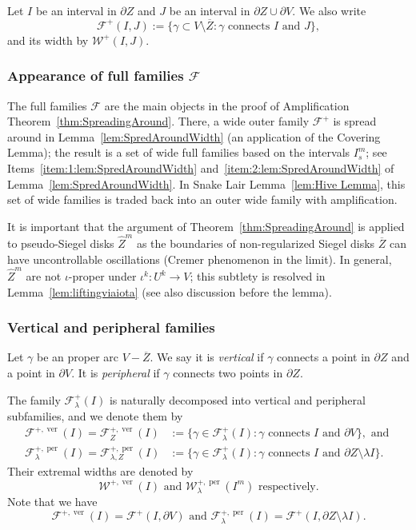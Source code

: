 \documentclass{amsart}
\newcommand{\1}{{\mathbb 1 }}
\newcommand{\Fam}{{\mathcal F}}
\newcommand{\Width}{{\mathcal W}}
\newcommand{\wZ}{{\widehat Z}}
\newcommand\ver{{\operatorname{ver}}}
\newcommand\per{{\operatorname{per}}}
\theoremstyle{remark}
\numberwithin{equation}{section}
\theoremstyle{definition}
\begin{document}
Let $I$ be an interval in $\partial Z$ and $J$ be an interval in $\partial Z \cup \partial V$. We also write
$$
\Fam^{+}(I, J):= \{\gamma \subset V \setminus \overline{Z}: \gamma \text{ connects $I$ and $J$}\},
$$
and its width by $\Width^{+}(I, J)$. 


\subsubsection{Appearance of full families $\Fam$}\label{sss:occ:Fam} The full families $\Fam$ are the main objects in the proof of Amplification Theorem~\ref{thm:SpreadingAround}. There, a wide outer family $\Fam^+$ is spread around in Lemma~\ref{lem:SpredAroundWidth} (an application of the Covering Lemma); the result is a set of wide full families based on the intervals $I^m_s$; see Items~\ref{item:1:lem:SpredAroundWidth} and~\ref{item:2:lem:SpredAroundWidth} of Lemma~\ref{lem:SpredAroundWidth}. In Snake Lair Lemma~\ref{lem:Hive Lemma}, this set of wide families is traded back into an outer wide family with amplification. 

It is important that the argument of Theorem~\ref{thm:SpreadingAround} is applied to pseudo-Siegel disks $\wZ^m$ as the boundaries of non-regularized Siegel disks $\overline Z$ can have uncontrollable oscillations (Cremer phenomenon in the limit). In general, $\wZ^m$ are not $\iota$-proper under $\iota^k\colon U^k\to V$; this subtlety is resolved in Lemma~\ref{lem:liftingviaiota} (see also discussion before the lemma).



\subsubsection{Vertical and peripheral families}\label{sss:Fam:VertPer}
Let $\gamma$ be an proper arc $ V - \overline{Z}$.
We say it is {\em vertical} if $\gamma$ connects a point in $\partial Z$ and a point in $\partial V$. It is {\em peripheral} if $\gamma$ connects two points in $\partial Z$.


The family $\Fam^+_\lambda(I)$ is naturally decomposed into vertical and peripheral subfamilies, and we denote them by
\begin{align*}
\Fam^{+, \ver}(I) = \Fam^{+, \ver}_{Z}(I) &:= \{\gamma \in \Fam^{+}_\lambda(I): \gamma \text{ connects $I$ and $\partial V$}\}, \text{ and }\\
\Fam^{+, \per}_{\lambda}(I) = \Fam^{+, \per}_{\lambda, Z}(I)  &:= \{\gamma \in \Fam^{+}_\lambda(I): \gamma \text{ connects $I$ and $\partial Z \setminus \lambda I$}\}.
\end{align*}
Their extremal widths are denoted by
$$
\Width^{+, \ver}(I)  \text{ and } \Width^{+, \per}_{\lambda}(I^m)  \text{ respectively}.
$$
Note that we have
$$
\Fam^{+, \ver}(I) = \Fam^{+}(I, \partial V) \text{ and } \Fam^{+, \per}_{\lambda}(I) = \Fam^+(I, \partial Z\setminus \lambda I).
$$
\end{document}
